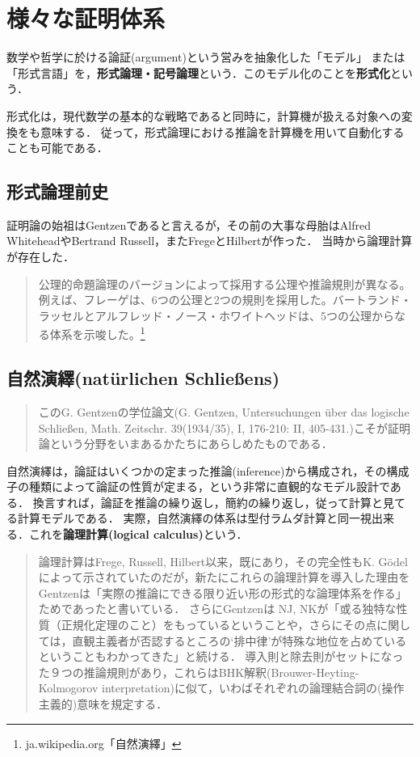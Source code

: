 \documentclass[uplatex, dvipdfmx]{jsreport}
\begin{document}
\chapter{様々な証明体系}

\begin{definition}
    数学や哲学に於ける論証(argument)という営みを抽象化した「モデル」
    または「形式言語」を，\textbf{形式論理・記号論理}という．このモデル化のことを\textbf{形式化}という．
\end{definition}
\begin{remark}
    形式化は，現代数学の基本的な戦略であると同時に，計算機が扱える対象への変換をも意味する．
    従って，形式論理における推論を計算機を用いて自動化することも可能である．
\end{remark}

\section{形式論理前史}
証明論の始祖はGentzenであると言えるが，その前の大事な母胎はAlfred WhiteheadやBertrand Russell，またFregeとHilbertが作った．
当時から論理計算が存在した．
\begin{quote}
    公理的命題論理のバージョンによって採用する公理や推論規則が異なる。例えば、フレーゲは、6つの公理と2つの規則を採用した。バートランド・ラッセルとアルフレッド・ノース・ホワイトヘッドは、5つの公理からなる体系を示唆した。\footnote{ja.wikipedia.org「自然演繹」}
\end{quote}

\section{自然演繹(natürlichen Schließens)}
\begin{quote}
    このG. Gentzenの学位論文(G. Gentzen, Untersuchungen über das logische Schließen, Math. Zeitschr. 39(1934/35), I, 176-210: II, 405-431.)こそが証明論という分野をいまあるかたちにあらしめたものである．\cite{新井敏康-Gentzen}
\end{quote}
自然演繹は，論証はいくつかの定まった推論(inference)から構成され，その構成子の種類によって論証の性質が定まる，という非常に直観的なモデル設計である．
換言すれば，論証を推論の繰り返し，簡約の繰り返し，従って計算と見てる計算モデルである．
実際，自然演繹の体系は型付ラムダ計算と同一視出来る．これを\textbf{論理計算(logical calculus)}という．
\begin{quote}
    論理計算はFrege, Russell, Hilbert以来，既にあり，その完全性もK. Gödelによって示されていたのだが，新たにこれらの論理計算を導入した理由をGentzenは「実際の推論にできる限り近い形の形式的な論理体系を作る」ためであったと書いている．
    さらにGentzenは NJ, NKが「或る独特な性質（正規化定理のこと）をもっているということや，さらにその点に関しては，直観主義者が否認するところの‘排中律’が特殊な地位を占めているということもわかってきた」と続ける．
    導入則と除去則がセットになった９つの推論規則があり，これらはBHK解釈(Brouwer-Heyting-Kolmogorov interpretation)に似て，いわばそれぞれの論理結合詞の(操作主義的)意味を規定する．\cite{新井敏康-Gentzen}
\end{quote}
\end{document}
